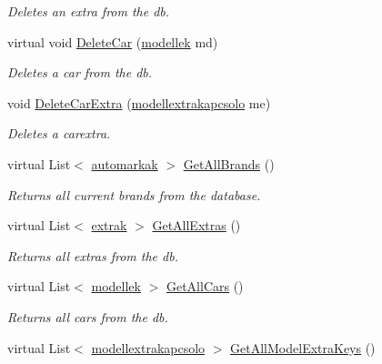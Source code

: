 \begin{DoxyCompactItemize}
\begin{DoxyCompactList}\small\item\em Deletes an extra from the db. \end{DoxyCompactList}\item 
virtual void \mbox{\hyperlink{class_car_shop_1_1_data_1_1_data_base_handler_a1ddb3e7a30ee321d3491593519734fec}{Delete\+Car}} (\mbox{\hyperlink{class_car_shop_1_1_data_1_1modellek}{modellek}} md)
\begin{DoxyCompactList}\small\item\em Deletes a car from the db. \end{DoxyCompactList}\item 
void \mbox{\hyperlink{class_car_shop_1_1_data_1_1_data_base_handler_aaa26584fccb994deb54909269824f550}{Delete\+Car\+Extra}} (\mbox{\hyperlink{class_car_shop_1_1_data_1_1modellextrakapcsolo}{modellextrakapcsolo}} me)
\begin{DoxyCompactList}\small\item\em Deletes a carextra. \end{DoxyCompactList}\item 
virtual List$<$ \mbox{\hyperlink{class_car_shop_1_1_data_1_1automarkak}{automarkak}} $>$ \mbox{\hyperlink{class_car_shop_1_1_data_1_1_data_base_handler_a30bf4a331f9a80dde8d5ffbe7c0b2c9d}{Get\+All\+Brands}} ()
\begin{DoxyCompactList}\small\item\em Returns all current brands from the database. \end{DoxyCompactList}\item 
virtual List$<$ \mbox{\hyperlink{class_car_shop_1_1_data_1_1extrak}{extrak}} $>$ \mbox{\hyperlink{class_car_shop_1_1_data_1_1_data_base_handler_a22ddee3a299ba5c46b2715e546210264}{Get\+All\+Extras}} ()
\begin{DoxyCompactList}\small\item\em Returns all extras from the db. \end{DoxyCompactList}\item 
virtual List$<$ \mbox{\hyperlink{class_car_shop_1_1_data_1_1modellek}{modellek}} $>$ \mbox{\hyperlink{class_car_shop_1_1_data_1_1_data_base_handler_a6ae5db47545f7b328ac0d6425371bf06}{Get\+All\+Cars}} ()
\begin{DoxyCompactList}\small\item\em Returns all cars from the db. \end{DoxyCompactList}\item 
virtual List$<$ \mbox{\hyperlink{class_car_shop_1_1_data_1_1modellextrakapcsolo}{modellextrakapcsolo}} $>$ \mbox{\hyperlink{class_car_shop_1_1_data_1_1_data_base_handler_a47536b1229086b5be7702d48454fca03}{Get\+All\+Model\+Extra\+Keys}} ()

\end{DoxyCompactItemize}
